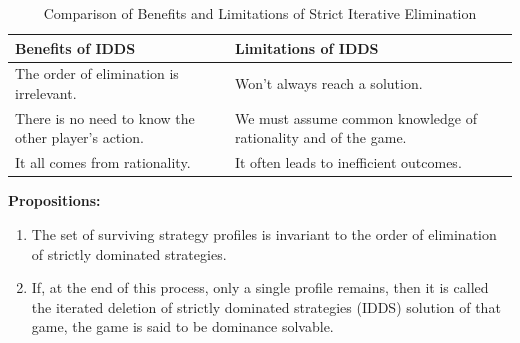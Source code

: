 \documentclass{article}
\begin{document}
\begin{table}[h]
    \centering
    \renewcommand{\arraystretch}{1.3}
    \begin{tabular}{|p{7cm}|p{7cm}|}
        \hline
        \textbf{Benefits of IDDS} & \textbf{Limitations of IDDS} \\
        \hline
        The order of elimination is irrelevant. & Won’t always reach a solution. \\
        There is no need to know the other player’s action. & We must assume common knowledge of rationality and of the game. \\
        It all comes from rationality. & It often leads to inefficient outcomes. \\
        \hline
    \end{tabular}
    \caption{Comparison of Benefits and Limitations of Strict Iterative Elimination}
    \label{table:elim_benefits_vs_limitations}
\end{table}

\noindent \textbf{Propositions:}
\begin{enumerate}
    \item The set of surviving strategy profiles is invariant to the order of elimination of strictly dominated strategies.
    \item If, at the end of this process, only a single profile remains, then it is called the iterated deletion of strictly dominated strategies (IDDS) solution of that game, the game is said to be dominance solvable.
\end{enumerate}
\end{document}
